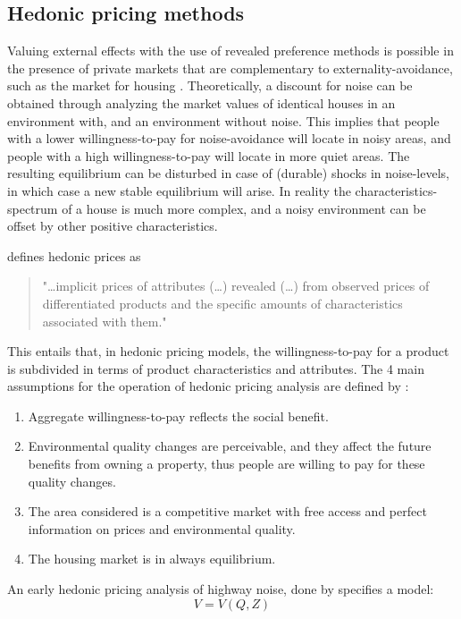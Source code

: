 \documentclass[a4paper]{scrartcl}
\begin{document}
\subsection{Hedonic pricing methods}

Valuing external effects with the use of revealed preference methods is possible in the presence of private markets that are complementary to externality-avoidance, such as the market for housing \citep{Nelson2008}. Theoretically, a discount for noise can be obtained through analyzing the market values of identical houses in an environment with, and an environment without noise. This implies that people with a lower willingness-to-pay for noise-avoidance will locate in noisy areas, and people with a high willingness-to-pay will locate in more quiet areas. The resulting equilibrium can be disturbed in case of (durable) shocks in noise-levels, in which case a new stable equilibrium will arise. In reality the characteristics-spectrum of a house is much more complex, and a noisy environment can be offset by other positive characteristics.

\cite{Rosen1974} defines hedonic prices as 
	\begin{quote}"\dots implicit prices of attributes (\dots) revealed (\dots) from observed prices of differentiated products and the specific amounts of characteristics associated with them."\end{quote} 
This entails that, in hedonic pricing models, the willingness-to-pay for a product is subdivided in terms of product characteristics and attributes. The 4 main assumptions for the operation of hedonic pricing analysis are defined by \cite{Bateman1993}:
\begin{enumerate}
	\item Aggregate willingness-to-pay reflects the social benefit.
	\item Environmental quality changes are perceivable, and they affect the future benefits from owning a property, thus people are willing to pay for these quality changes.
	\item The area considered is a competitive market with free access and perfect information on prices and environmental quality.
	\item The housing market is in always equilibrium.
\end{enumerate}
An early hedonic pricing analysis of highway noise, done by \cite{Nelson1982} specifies a model:
\begin{equation}
V = V(Q, Z)
\end{equation}
\end{document}
